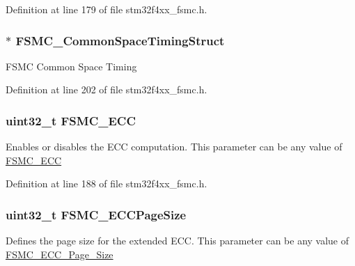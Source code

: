Definition at line 179 of file stm32f4xx\-\_\-fsmc.\-h.

\hypertarget{struct_f_s_m_c___n_a_n_d_init_type_def_aec43dfa3b0c0ef09b02ac1b27cac92c7}{
\subsubsection[{F\-S\-M\-C\-\_\-\-Common\-Space\-Timing\-Struct}]{$\ast$ F\-S\-M\-C\-\_\-\-Common\-Space\-Timing\-Struct}}\label{struct_f_s_m_c___n_a_n_d_init_type_def_aec43dfa3b0c0ef09b02ac1b27cac92c7}
F\-S\-M\-C Common Space Timing 

Definition at line 202 of file stm32f4xx\-\_\-fsmc.\-h.

\hypertarget{struct_f_s_m_c___n_a_n_d_init_type_def_a55c67a186e64de7086510dca7538db2a}{
\subsubsection[{F\-S\-M\-C\-\_\-\-E\-C\-C}]{\setlength{\rightskip}{0pt plus 5cm}uint32\-\_\-t F\-S\-M\-C\-\_\-\-E\-C\-C}}\label{struct_f_s_m_c___n_a_n_d_init_type_def_a55c67a186e64de7086510dca7538db2a}
Enables or disables the E\-C\-C computation. This parameter can be any value of \hyperlink{group___f_s_m_c___e_c_c}{F\-S\-M\-C\-\_\-\-E\-C\-C} 

Definition at line 188 of file stm32f4xx\-\_\-fsmc.\-h.

\hypertarget{struct_f_s_m_c___n_a_n_d_init_type_def_a725f883015c7b7a94917b12e6dc79ee2}{
\subsubsection[{F\-S\-M\-C\-\_\-\-E\-C\-C\-Page\-Size}]{\setlength{\rightskip}{0pt plus 5cm}uint32\-\_\-t F\-S\-M\-C\-\_\-\-E\-C\-C\-Page\-Size}}\label{struct_f_s_m_c___n_a_n_d_init_type_def_a725f883015c7b7a94917b12e6dc79ee2}
Defines the page size for the extended E\-C\-C. This parameter can be any value of \hyperlink{group___f_s_m_c___e_c_c___page___size}{F\-S\-M\-C\-\_\-\-E\-C\-C\-\_\-\-Page\-\_\-\-Size} 


